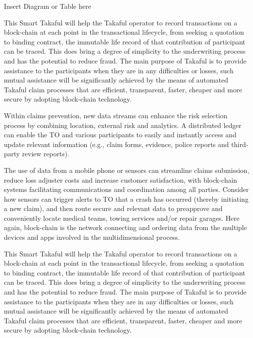 \documentclass[a4paper,11pt]{article}
\begin{document}
                                    Insert Diagram or Table here


This Smart Takaful will help the Takaful operator to record transactions on a block-chain at each point in the transactional lifecycle, from seeking a quotation to binding contract, the immutable life record of that contribution of participant can be traced. This does bring a degree of simplicity to the underwriting process and has the potential to reduce fraud. The main purpose of Takaful is to provide assistance to the participants when they are in any difficulties or losses, such mutual assistance will be significantly achieved by the means of automated Takaful claim processes that are efficient, transparent, faster, cheaper and more secure by adopting block-chain technology.

Within claims prevention, new data streams can enhance the risk selection process by combining location, external risk and analytics. A distributed ledger can enable the TO and various participants to easily and instantly access and update relevant information (e.g., claim forms, evidence, police reports and third-party review reports). 

The use of data from a mobile phone or sensors can streamline claims submission, reduce loss adjuster costs and increase customer satisfaction, with block-chain systems facilitating communications and coordination among all parties. Consider how sensors can trigger alerts to TO that a crash has occurred (thereby initiating a new claim), and then route secure and relevant data to preapprove and conveniently locate medical teams, towing services and/or repair garages. Here again, block-chain is the network connecting and ordering data from the multiple devices and apps involved in the multidimensional process. 

This Smart Takaful will help the Takaful operator to record transactions on a block-chain at each point in the transactional lifecycle, from seeking a quotation to binding contract, the immutable life record of that contribution of participant can be traced. This does bring a degree of simplicity to the underwriting process and has the potential to reduce fraud. The main purpose of Takaful is to provide assistance to the participants when they are in any difficulties or losses, such mutual assistance will be significantly achieved by the means of automated Takaful claim processes that are efficient, transparent, faster, cheaper and more secure by adopting block-chain technology.
\end{document}
